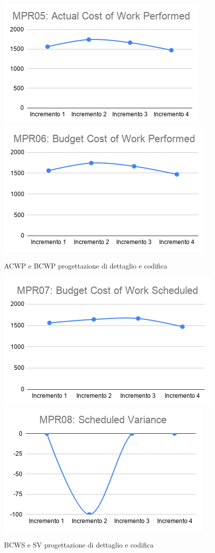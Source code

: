 \begin{figure}[h!]
	\includegraphics[scale=0.6]{Immagini/ACWP_PDettaglio.png}\quad
	\includegraphics[scale=0.6]{Immagini/BCWP_PDettaglio.png}
	\caption{ACWP e BCWP progettazione di dettaglio e codifica}
	\label{fig:BCWP_PDettaglio}
\end{figure}
\begin{figure}[h!]
	\includegraphics[scale=0.5]{Immagini/BCWS_PDettaglio.png}\quad
	\includegraphics[scale=0.6]{Immagini/SV_PDettaglio.png}
	\caption{BCWS e SV progettazione di dettaglio e codifica}
	\label{fig:SV_PDettaglio}
\end{figure}
